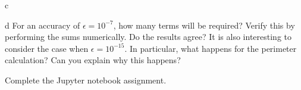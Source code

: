 \documentclass[]{homework}
\begin{document}
\begin{problem}{1}
\begin{subproblem}{c}
  \end{subproblem}
  \begin{subproblem}{d}
    For an accuracy of $\epsilon=10^{-7}$, how many terms will be required?
    Verify this by performing the sums numerically.
    Do the results agree?
    It is also interesting to consider the case when $\epsilon=10^{-15}$.  In particular, what happens for the perimeter calculation? Can you explain why this happens?
  \end{subproblem}
\end{problem}


\begin{problem}{2}
  Complete the Jupyter notebook assignment.
\end{problem}
\end{document}

